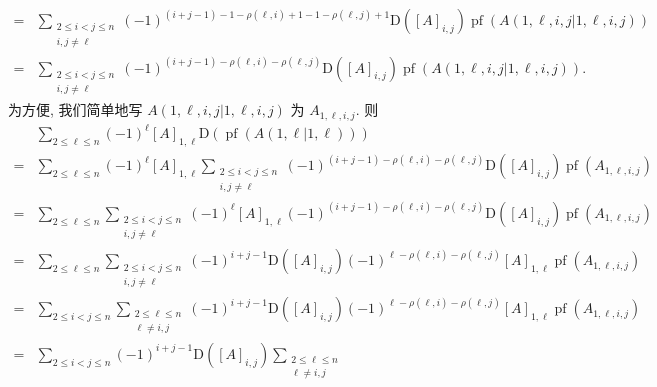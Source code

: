 \documentclass[../libro.tex]{subfiles}
\begin{document}
\begin{example}
\begin{align*}
        = {} &
        \sum_{\substack{2 \leq i < j \leq n \\ i, j \neq \ell}}
        {(-1)^{(i+j-1)-1-\rho(\ell, i)+1-1-\rho(\ell, j)+1}
            \mathrm{D} ([A]_{i,j})
        \operatorname{pf} {(A({1,\ell,i,j}|{1,\ell,i,j}))}}
        \\
        = {} &
        \sum_{\substack{2 \leq i < j \leq n \\ i, j \neq \ell}}
        {(-1)^{(i+j-1)-\rho(\ell, i)-\rho(\ell, j)}
            \mathrm{D} ([A]_{i,j})
        \operatorname{pf} {(A({1,\ell,i,j}|{1,\ell,i,j}))}}.
    \end{align*}
    为方便, 我们简单地写 \(A({1,\ell,i,j}|{1,\ell,i,j})\)
    为 \(A_{1,\ell,i,j}\).
    则
    \begin{align*}
        &
        \sum_{2 \leq \ell \leq n}
        (-1)^{\ell} [A]_{1,\ell}
        \mathrm{D} (\operatorname{pf} {(A({1,\ell}|{1,\ell}))})
        \\
        = {} &
        \sum_{2 \leq \ell \leq n}
        (-1)^{\ell} [A]_{1,\ell}
        \sum_{\substack{2 \leq i < j \leq n \\ i, j \neq \ell}}
        (-1)^{(i+j-1)-\rho(\ell, i)-\rho(\ell, j)}
        \mathrm{D} ([A]_{i,j})
        \operatorname{pf} {(A_{1,\ell,i,j})}
        \\
        = {} &
        \sum_{2 \leq \ell \leq n}
        \sum_{\substack{2 \leq i < j \leq n \\ i, j \neq \ell}}
        (-1)^{\ell} [A]_{1,\ell}
        (-1)^{(i+j-1)-\rho(\ell, i)-\rho(\ell, j)}
        \mathrm{D} ([A]_{i,j})
        \operatorname{pf} {(A_{1,\ell,i,j})}
        \\
        = {} &
        \sum_{2 \leq \ell \leq n}
        \sum_{\substack{2 \leq i < j \leq n \\ i, j \neq \ell}}
        (-1)^{i+j-1} \mathrm{D} ([A]_{i,j})
        (-1)^{\ell-\rho(\ell, i)-\rho(\ell, j)} [A]_{1,\ell}
        \operatorname{pf} {(A_{1,\ell,i,j})}
        \\
        = {} &
        \sum_{2 \leq i < j \leq n}
        \sum_{\substack{2 \leq \ell \leq n \\ \ell \neq i, j}}
        (-1)^{i+j-1} \mathrm{D} ([A]_{i,j})
        (-1)^{\ell-\rho(\ell, i)-\rho(\ell, j)} [A]_{1,\ell}
        \operatorname{pf} {(A_{1,\ell,i,j})}
        \\
        = {} &
        \sum_{2 \leq i < j \leq n}
        (-1)^{i+j-1} \mathrm{D} ([A]_{i,j})
        \sum_{\substack{2 \leq \ell \leq n \\ \ell \neq i, j}}

\end{align*}
\end{example}
\end{document}
